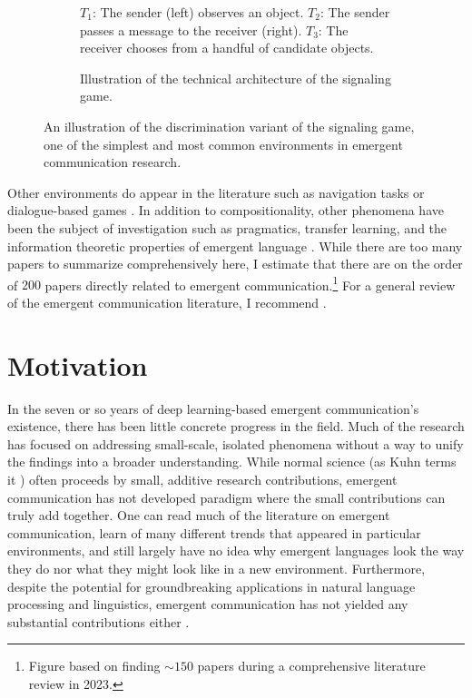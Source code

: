 \begin{figure}
  \centering
  \begin{subfigure}[b]{0.53\textwidth}
    \centering
    \setlength\fboxsep{0pt}
    
    \vspace{1cm}
    \caption{%
      $T_1$: The sender (left) observes an object.
      $T_2$: The sender passes a message to the receiver (right).
      $T_3$: The receiver chooses from a handful of candidate objects.
    }
    \unskip\label{fig:boxface}
  \end{subfigure}
  \hfill
  \begin{subfigure}[b]{0.45\textwidth}
    \centering
    
    \caption{Illustration of the technical architecture of the signaling game.}
    \unskip\label{fig:signaling-chart}
  \end{subfigure}
  \caption{%
    An illustration of the discrimination variant of the signaling game, one of the simplest and most common environments in emergent communication research.
  }
  \unskip\label{fig:signaling-game}
\end{figure}


Other environments do appear in the literature such as navigation tasks or dialogue-based games
  \citep{unger2020GeneralizingEC,brandizzi2022rlupus}.
In addition to compositionality, other phenomena have been the subject of investigation such as pragmatics, transfer learning, and the information theoretic properties of emergent language
  \citep{kang2020incorporatingpragmaticreasoningcommunication,yao2022linking,tucker2021discrete}.
While there are too many papers to summarize comprehensively here, I estimate that there are on the order of $200$ papers directly related to emergent communication.\footnote{Figure based on finding ${\sim}150$ papers during a comprehensive literature review in 2023.}
For a general review of the emergent communication literature, I recommend \citet{lazaridou2020emergentmultiagentcommunicationdeep}.

\section{Motivation}

In the seven or so years of deep learning-based emergent communication's existence, there has been little concrete progress in the field.
Much of the research has focused on addressing small-scale, isolated phenomena without a way to unify the findings into a broader understanding.
While normal science (as Kuhn terms it \citep{kuhn}) often proceeds by small, additive research contributions, emergent communication has not developed paradigm where the small contributions can truly add together.
One can read much of the literature on emergent communication, learn of many different trends that appeared in particular environments, and still largely have no idea why emergent languages look the way they do nor what they might look like in a new environment.
Furthermore, despite the potential for groundbreaking applications in natural language processing and linguistics, emergent communication has not yielded any substantial contributions either \citep{boldt2024review}.

